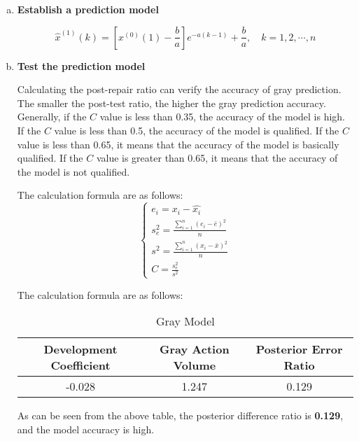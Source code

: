 \documentclass[12pt]{article}
\begin{document}
\begin{description}
\begin{enumerate}[a)]
			\item \textbf{Establish a prediction model}
			
			\begin{equation}\label{eq:gray_model}
				\hat{x}^{(1)}(k) = \left [ x^{(0)}(1) - \frac{b}{a}  \right ]e^{-a(k-1)} + \frac{b}{a}, \quad k = 1,2,\cdots,n  
			\end{equation}
			
			\item \textbf{Test the prediction model}
			
			\quad Calculating the post-repair ratio can verify the accuracy of gray prediction.
			The smaller the post-test ratio, the higher the gray prediction accuracy. Generally, if the $C$ value is less than 0.35, the accuracy of the model is high. If the $C$ value is less than 0.5, the accuracy of the model is qualified.
			If the $C$ value is less than 0.65, it means that the accuracy of the model is basically qualified.
			If the $C$ value is greater than 0.65, it means that the accuracy of the model is not qualified.
			
			\quad The calculation formula are as follows:
			\begin{equation}
				\begin{cases}
					e_{i} = x_{i} - \hat{x_{i}} \\
					s_{e}^{2} = \frac{\sum_{i=1}^{n} (e_{i} - \bar{e})^{2}}{n}  \\
					s^{2} = \frac{\sum_{i=1}^{n} (x_{i} - \bar{x})^{2}}{n}\\
					C = \frac{s_{e}^{2}}{s^{2}} 
				\end{cases}
			\end{equation}
			
			\quad The calculation formula are as follows:
			
			\begin{table}[!htbp]
				\begin{center}
					\caption{Gray Model}
					\label{tb:gray_model}
					\begin{tabular}{ccc}
						\toprule
						\multicolumn{1}{m{6cm}}{\centering \textbf{Development Coefficient}}
						& \multicolumn{1}{m{4cm}}{\centering \textbf{Gray Action Volume}}
						& \multicolumn{1}{m{4cm}}{\centering \textbf{Posterior Error Ratio}}\\
						\midrule
						-0.028 & 1.247 & 0.129 \\
						\bottomrule
					\end{tabular}
				\end{center}
			\end{table}	
			
			As can be seen from the above table, the posterior difference ratio is \textbf{0.129}, and the model accuracy is high.
			
			
			
		\end{enumerate}
			
	\end{description}
\end{document}

